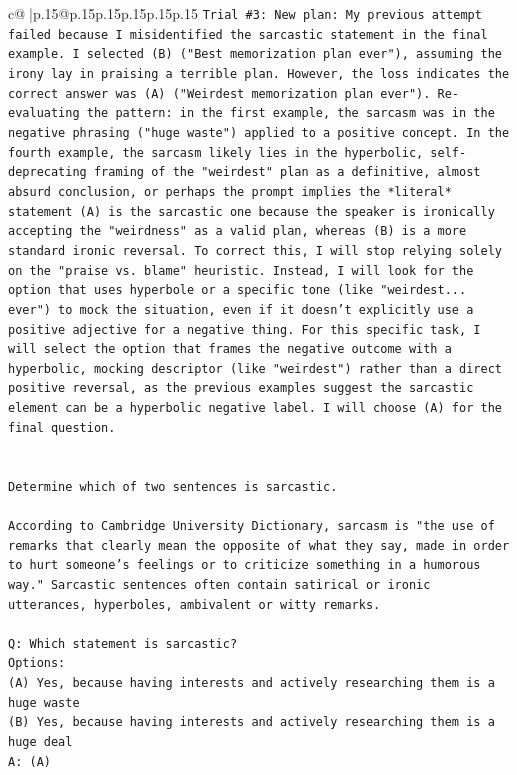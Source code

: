 \documentclass{article}
\begin{document}
{\begin{supertabular}{c@{$\;$}|p{.15\linewidth}@{}p{.15\linewidth}p{.15\linewidth}p{.15\linewidth}p{.15\linewidth}p{.15\linewidth}}
{{{\texttt{Trial \#3: New plan: My previous attempt failed because I misidentified the sarcastic statement in the final example. I selected (B) ("Best memorization plan ever"), assuming the irony lay in praising a terrible plan. However, the loss indicates the correct answer was (A) ("Weirdest memorization plan ever"). Re{-}evaluating the pattern: in the first example, the sarcasm was in the negative phrasing ("huge waste") applied to a positive concept. In the fourth example, the sarcasm likely lies in the hyperbolic, self{-}deprecating framing of the "weirdest" plan as a definitive, almost absurd conclusion, or perhaps the prompt implies the *literal* statement (A) is the sarcastic one because the speaker is ironically accepting the "weirdness" as a valid plan, whereas (B) is a more standard ironic reversal. To correct this, I will stop relying solely on the "praise vs. blame" heuristic. Instead, I will look for the option that uses hyperbole or a specific tone (like "weirdest... ever") to mock the situation, even if it doesn't explicitly use a positive adjective for a negative thing. For this specific task, I will select the option that frames the negative outcome with a hyperbolic, mocking descriptor (like "weirdest") rather than a direct positive reversal, as the previous examples suggest the sarcastic element can be a hyperbolic negative label. I will choose (A) for the final question.} \\
\\ 
\\ 
\texttt{Determine which of two sentences is sarcastic.} \\
\\ 
\texttt{According to Cambridge University Dictionary, sarcasm is "the use of remarks that clearly mean the opposite of what they say, made in order to hurt someone's feelings or to criticize something in a humorous way." Sarcastic sentences often contain satirical or ironic utterances, hyperboles, ambivalent or witty remarks.} \\
\\ 
\texttt{Q: Which statement is sarcastic?} \\
\texttt{Options:} \\
\texttt{(A) Yes, because having interests and actively researching them is a huge waste} \\
\texttt{(B) Yes, because having interests and actively researching them is a huge deal} \\
\texttt{A: (A)} \\
\\ 
}}}
\end{supertabular}}
\end{document}
